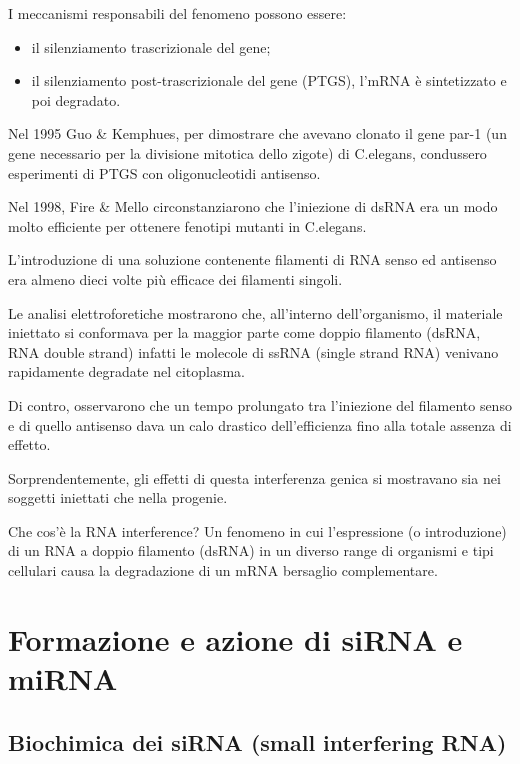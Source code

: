 \documentclass[]{article}
\begin{document}
I meccanismi responsabili del fenomeno possono essere:

\begin{itemize}
\itemsep1pt\parskip0pt
\item
  il silenziamento trascrizionale del gene;
\item
  il silenziamento post-trascrizionale del gene (PTGS), l'mRNA è
  sintetizzato e poi degradato.
\end{itemize}

Nel 1995 Guo \& Kemphues, per dimostrare che avevano clonato il gene
par-1 (un gene necessario per la divisione mitotica dello zigote) di
C.elegans, condussero esperimenti di PTGS con oligonucleotidi antisenso.

Nel 1998, Fire \& Mello circonstanziarono che l'iniezione di dsRNA era
un modo molto efficiente per ottenere fenotipi mutanti in C.elegans.

L'introduzione di una soluzione contenente filamenti di RNA senso ed
antisenso era almeno dieci volte più efficace dei filamenti singoli.

Le analisi elettroforetiche mostrarono che, all'interno dell'organismo,
il materiale iniettato si conformava per la maggior parte come doppio
filamento (dsRNA, RNA double strand) infatti le molecole di ssRNA
(single strand RNA) venivano rapidamente degradate nel citoplasma.

Di contro, osservarono che un tempo prolungato tra l'iniezione del
filamento senso e di quello antisenso dava un calo drastico
dell'efficienza fino alla totale assenza di effetto.

Sorprendentemente, gli effetti di questa interferenza genica si
mostravano sia nei soggetti iniettati che nella progenie.

Che cos'è la RNA interference? Un fenomeno in cui l'espressione (o
introduzione) di un RNA a doppio filamento (dsRNA) in un diverso range
di organismi e tipi cellulari causa la degradazione di un mRNA bersaglio
complementare.

\section{Formazione e azione di siRNA e
miRNA}\label{formazione-e-azione-di-sirna-e-mirna}

\subsection{Biochimica dei siRNA (small interfering
RNA)}\label{biochimica-dei-sirna-small-interfering-rna}
\end{document}
